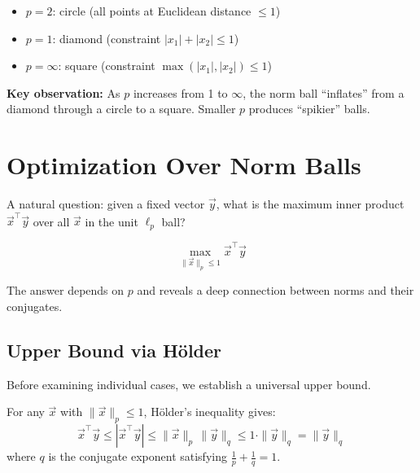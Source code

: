 \documentclass[10pt, twocolumn]{article}
\theoremstyle{definition}
\theoremstyle{plain}
\begin{document}
\begin{itemize}
    \item $p = 2$: circle (all points at Euclidean distance $\le 1$)
    \item $p = 1$: diamond (constraint $|x_1| + |x_2| \le 1$)
    \item $p = \infty$: square (constraint $\max(|x_1|, |x_2|) \le 1$)
\end{itemize}

\begin{tcolorbox}[colframe=black!50]
\textbf{Key observation:} As $p$ increases from 1 to $\infty$, the norm ball ``inflates'' from a diamond through a circle to a square. Smaller $p$ produces ``spikier'' balls.
\end{tcolorbox}

\section{Optimization Over Norm Balls}

A natural question: given a fixed vector $\vec{y}$, what is the maximum inner product $\vec{x}^\top \vec{y}$ over all $\vec{x}$ in the unit $\ell_p$ ball?

\begin{result}
\[
    \max_{\|\vec{x}\|_p \le 1} \vec{x}^\top \vec{y}
\]
\end{result}

The answer depends on $p$ and reveals a deep connection between norms and their conjugates.

\subsection{Upper Bound via H\"{o}lder}

Before examining individual cases, we establish a universal upper bound.

For any $\vec{x}$ with $\|\vec{x}\|_p \le 1$, H\"{o}lder's inequality gives:
\[
    \vec{x}^\top \vec{y} \le |\vec{x}^\top \vec{y}| \le \|\vec{x}\|_p \, \|\vec{y}\|_q \le 1 \cdot \|\vec{y}\|_q = \|\vec{y}\|_q
\]
where $q$ is the conjugate exponent satisfying $\frac{1}{p} + \frac{1}{q} = 1$.
\end{document}
